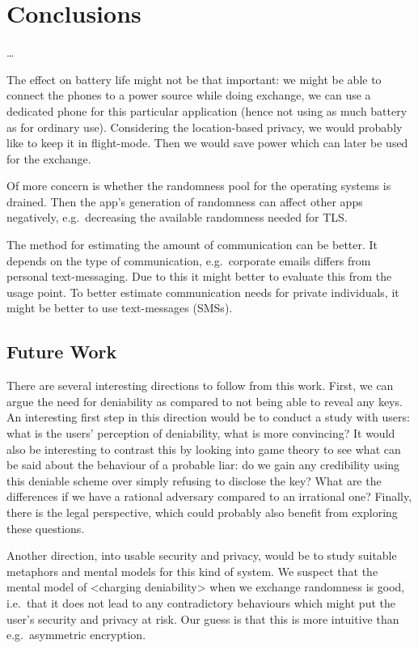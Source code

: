 \section{Conclusions}
\label{sec:Conclusions}

\dots

The effect on battery life might not be that important: we might be able to 
connect the phones to a power source while doing exchange, we can use 
a dedicated phone for this particular application (hence not using as much 
battery as for ordinary use).
Considering the location-based privacy, we would probably like to keep it in 
flight-mode.
Then we would save power which can later be used for the exchange.

Of more concern is whether the randomness pool for the operating systems is 
drained.
Then the app's generation of randomness can affect other apps negatively, 
e.g.~decreasing the available randomness needed for TLS\@.

The method for estimating the amount of communication can be better.
It depends on the type of communication, e.g.~corporate emails differs from 
personal text-messaging.
Due to this it might better to evaluate this from the usage point.
To better estimate communication needs for private individuals, it might be 
better to use text-messages (SMSs).

\subsection{Future Work}

There are several interesting directions to follow from this work.
First, we can argue the need for deniability as compared to not being able to 
reveal any keys.
An interesting first step in this direction would be to conduct a study with 
users: what is the users' perception of deniability, what is more convincing?
It would also be interesting to contrast this by looking into game theory to 
see what can be said about the behaviour of a probable liar: do we gain any 
credibility using this deniable scheme over simply refusing to disclose the 
key?
What are the differences if we have a rational adversary compared to an 
irrational one?
Finally, there is the legal perspective, which could probably also benefit from 
exploring these questions.

Another direction, into usable security and privacy, would be to study suitable 
metaphors and mental models for this kind of system.
We suspect that the mental model of <charging deniability> when we exchange 
randomness is good, i.e.~that it does not lead to any contradictory behaviours 
which might put the user's security and privacy at risk.
Our guess is that this is more intuitive than e.g.~asymmetric encryption.

